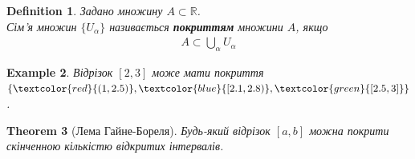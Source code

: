 \documentclass[a4paper, 14pt]{article}
\theoremstyle{theoremdd}
\newtheorem{theorem}{Theorem}[subsection]
\theoremstyle{theoremdd}
\newtheorem{definition}[theorem]{Definition}
\theoremstyle{theoremdd}
\theoremstyle{theoremdd}
\newtheorem{example}[theorem]{Example}
\theoremstyle{theoremdd}
\theoremstyle{theoremdd}
\theoremstyle{theoremdd}
\theoremstyle{theoremdd}
\begin{document}
	\begin{definition}
	Задано множину $A \subset \mathbb{R}$.\\
	Сім'я множин $\{U_{\alpha}\}$ називається \textbf{покриттям} множини $A$, якщо
	\begin{align*}
	A \subset \bigcup_{\alpha} U_{\alpha}
	\end{align*}
	\end{definition}
	
	\begin{example}
	Відрізок $[2,3]$ може мати покриття $\{\textcolor{red}{(1,2.5)}, \textcolor{blue}{[2.1,2.8)}, \textcolor{green}{[2.5,3]}\}$.
	\begin{figure}[H]
	\centering
	\end{figure}
	\end{example}
	
	\begin{theorem}[Лема Гайне-Бореля]
	Будь-який відрізок $[a,b]$ можна покрити скінченною кількістю відкритих інтервалів.

	\end{theorem}
	
\end{document}
